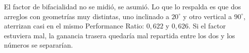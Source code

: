 \documentclass[11pt,a4paper]{article}
\begin{document}
\vspace{1em}
\begin{clave}[title=Convergencia como validación]
El factor de bifacialidad no se midió, se asumió. Lo que lo respalda es que dos arreglos
con geometrías muy distintas, uno inclinado a $20^\circ$ y otro vertical a $90^\circ$,
aterrizan casi en el mismo Performance Ratio: $0{,}622$ y $0{,}626$. Si el factor
estuviera mal, la ganancia trasera quedaría mal repartida entre los dos y los números se
separarían.
\end{clave}
\end{document}
